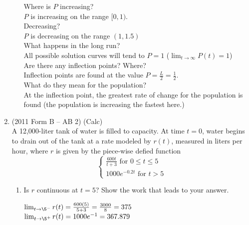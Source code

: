 \documentclass[10pt,letterpaper]{report}
\begin{document}
\begin{enumerate}
\begin{enumerate}
{    Where is $P$ increasing? \\
    
    $P$ is increasing on the range $[0,1)$.\\
    
    Decreasing? \\
    
    $P$ is decreasing on the range $(1, 1.5)$ \\
    
    What happens in the long run? \\
    
    All possible solution curves will tend to $P=1$ ($\lim_{t\to\infty}P(t)=1$) \\
    
    Are there any inflection points? Where? \\
    
    Inflection points are found at the value $P=\frac{L}{2}=\frac{1}{2}$. \\
    
    What do they mean for the population? \\
    
    At the inflection point, the greatest rate of change for the population is found (the population is increasing the fastest here.) \\}
  \end{enumerate}
  
  \pagebreak
  
  \item{(2011 Form B -- AB 2) (Calc) \\
  A 12,000-liter tank of water is filled to capacity. At time $t=0$, water begins to drain out of the tank at a rate modeled by $r(t)$, measured in liters per hour, where $r$ is given by the piece-wise defied function \[ \begin{cases} 
      \frac{600t}{t+3} \text{ for } 0\leq t\leq 5 \\
      1000e^{-0.2t} \text{ for } t > 5 
   \end{cases}
\]}
  \begin{enumerate}
    \item{Is $r$ continuous at $t=5$? Show the work that leads to your answer. \\}
    
      $\lim_{t\to\5^{-}}r(t)=\frac{600(5)}{5+3}=\frac{3000}{8}=375$ \\
      
      $\lim_{t\to\5^{+}}r(t)=1000e^{-1}=367.879$ \\
      

\end{enumerate}
\end{enumerate}
\end{document}
